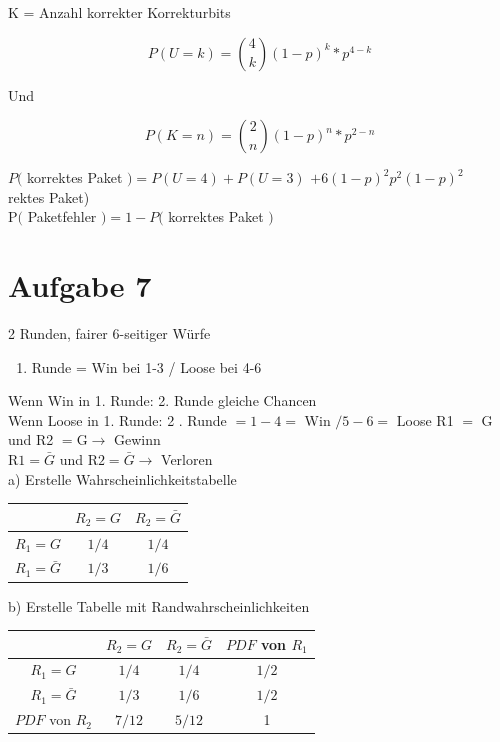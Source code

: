 \documentclass[10pt]{article}
\begin{document}
{K = Anzahl korrekter Korrekturbits

$$
P(U=k)=\binom{4}{k}(1-p)^{k} * p^{4-k}
$$

Und

$$
P(K=n)=\binom{2}{n}(1-p)^{n} * p^{2-n}
$$

$P($ korrektes Paket $)=P(U=4)+P(U=3)$ $+6(1-p)^{2} p^{2}(1-p)^{2}$\\
rektes Paket)\\
$\mathrm{P}($ Paketfehler $)=1-P($ korrektes Paket $)$

\section*{Aufgabe 7}
2 Runden, fairer 6-seitiger Würfe

\begin{enumerate}
  \item Runde = Win bei 1-3 / Loose bei 4-6
\end{enumerate}

Wenn Win in 1. Runde: 2. Runde gleiche Chancen\\
Wenn Loose in 1. Runde: 2 . Runde $=1-4=$ Win $/ 5-6=$ Loose R1 $=$ G und R2 $=\mathrm{G} \rightarrow$ Gewinn\\
$\mathrm{R} 1=\bar{G}$ und $\mathrm{R} 2=\bar{G} \rightarrow$ Verloren\\
a) Erstelle Wahrscheinlichkeitstabelle

\begin{center}
\begin{tabular}{|c|c|c|}
\hline
 & $R_{2}=G$ & $R_{2}=\bar{G}$ \\
\hline
$R_{1}=G$ & $1 / 4$ & $1 / 4$ \\
\hline
$R_{1}=\bar{G}$ & $1 / 3$ & $1 / 6$ \\
\hline
\end{tabular}
\end{center}

b) Erstelle Tabelle mit Randwahrscheinlichkeiten

\begin{center}
\begin{tabular}{|c|c|c|c|}
\hline
 & $R_{2}=G$ & $R_{2}=\bar{G}$ & $P D F$ von $R_{1}$ \\
\hline
$R_{1}=G$ & $1 / 4$ & $1 / 4$ & $1 / 2$ \\
\hline
$R_{1}=\bar{G}$ & $1 / 3$ & $1 / 6$ & $1 / 2$ \\
\hline
$P D F$ von $R_{2}$ & $7 / 12$ & $5 / 12$ & 1 \\
\hline
\end{tabular}
\end{center}

}
\end{document}
